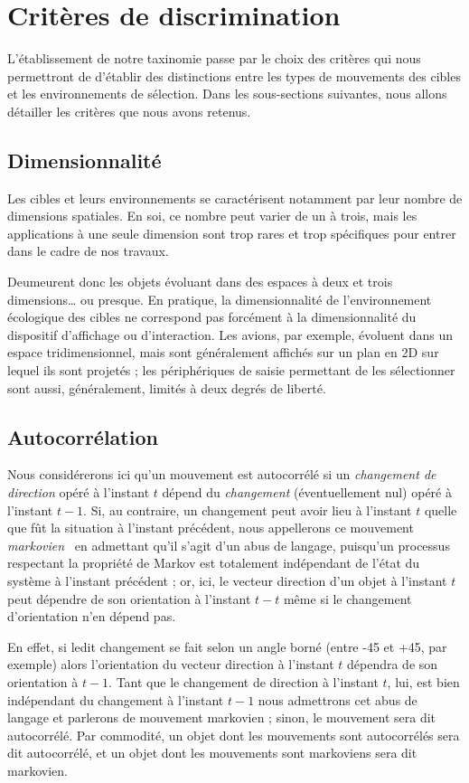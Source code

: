 \section{Critères de discrimination}
    L'établissement de notre taxinomie passe par le choix des critères qui nous permettront de d'établir des distinctions entre les types de mouvements des cibles et les environnements de sélection. Dans les sous-sections suivantes, nous allons détailler les critères que nous avons retenus.
    
    \subsection{Dimensionnalité}
    Les cibles et leurs environnements se caractérisent notamment par leur nombre de dimensions spatiales. En soi, ce nombre peut varier de un à trois, mais les applications à une seule dimension sont trop rares et trop spécifiques pour entrer dans le cadre de nos travaux.
    
    Deumeurent donc les objets évoluant dans des espaces à deux et trois dimensions\ldots{} ou presque. En pratique, la dimensionnalité de l'environnement \og écologique \fg{} des cibles ne correspond pas forcément à la dimensionnalité du dispositif d'affichage ou d'interaction. Les avions, par exemple, évoluent dans un espace tridimensionnel, mais sont généralement affichés sur un plan en 2D sur lequel ils sont projetés ; les périphériques de saisie permettant de les sélectionner sont aussi, généralement, limités à deux degrés de liberté.

    \subsection{Autocorrélation}
    Nous considérerons ici qu'un mouvement est autocorrélé si un \emph{changement de direction} opéré à l'instant $t$ dépend du \emph{changement} (éventuellement nul) opéré à l'instant $t-1$. Si, au contraire, un changement peut avoir lieu à l'instant $t$ quelle que fût la situation à l'instant précédent, nous appellerons ce mouvement \emph{markovien}~\cite{markov1960theory} en admettant qu'il s'agit d'un abus de langage, puisqu'un processus respectant la propriété de Markov est totalement indépendant de l'état du système à l'instant précédent ; or, ici, le vecteur direction d'un objet à l'instant $t$ peut dépendre de son orientation à l'instant $t-t$ même si le changement d'orientation n'en dépend pas.
    
    En effet, si ledit changement se fait selon un angle borné (entre -45\textdegree{} et +45\textdegree{}, par exemple) alors l'orientation du vecteur direction à l'instant $t$ dépendra de son orientation à $t-1$. Tant que le changement de direction à l'instant $t$, lui, est bien indépendant du changement à l'instant $t-1$ nous admettrons cet abus de langage et parlerons de mouvement markovien ; sinon, le mouvement sera dit autocorrélé. Par commodité, un objet dont les mouvements sont autocorrélés sera dit autocorrélé, et un objet dont les mouvements sont markoviens sera dit markovien.
    
